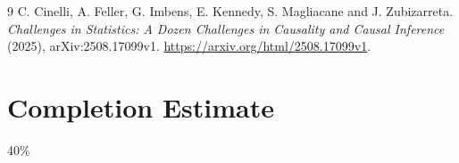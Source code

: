 \documentclass[11pt]{article}
\theoremstyle{definition}
\begin{document}
\begin{thebibliography}{9}
 C. Cinelli, A. Feller, G. Imbens, E. Kennedy, S. Magliacane and J. Zubizarreta.
\emph{Challenges in Statistics: A Dozen Challenges in Causality and Causal Inference} (2025), arXiv:2508.17099v1.
\url{https://arxiv.org/html/2508.17099v1}.
\end{thebibliography}
\section{Completion Estimate}
40\%
\end{document}
